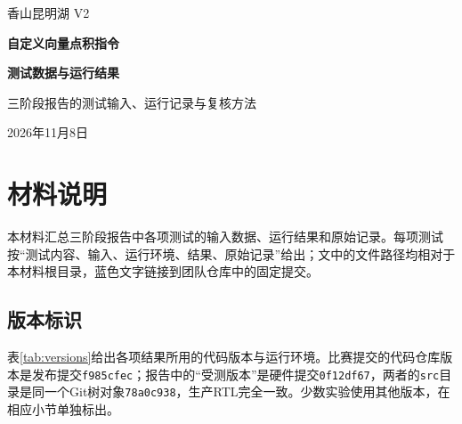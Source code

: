 


\begin{titlepage}\thispagestyle{empty}\centering
\vspace*{17mm}
{\Large 香山昆明湖 V2\par}\vspace{9mm}
{\Huge\bfseries 自定义向量点积指令\par}\vspace{9mm}
{\LARGE\bfseries 测试数据与运行结果\par}\vspace{7mm}
{\large 三阶段报告的测试输入、运行记录与复核方法\par}
\vfill
{\normalsize 2026年11月8日\par}\vspace{13mm}
\end{titlepage}

\tableofcontents\clearpage{}

\section{材料说明}

本材料汇总三阶段报告中各项测试的输入数据、运行结果和原始记录。每项测试按“测试内容、输入、运行环境、结果、原始记录”给出；文中的文件路径均相对于本材料根目录，蓝色文字链接到团队仓库中的固定提交。

\subsection{版本标识}

表\ref{tab:versions}给出各项结果所用的代码版本与运行环境。比赛提交的代码仓库版本是发布提交\texttt{f985cfec}；报告中的“受测版本”是硬件提交\texttt{0f12df67}，两者的\texttt{src}目录是同一个Git树对象\texttt{78a0c938}，生产RTL完全一致。少数实验使用其他版本，在相应小节单独标出。

